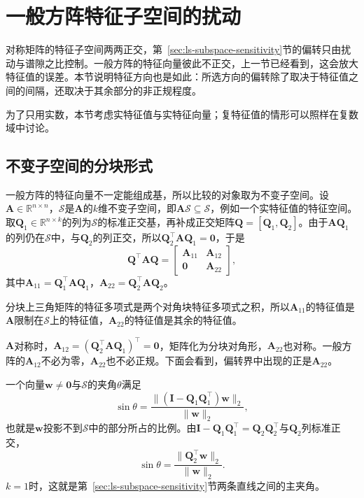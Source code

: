 
\section{一般方阵特征子空间的扰动}
\label{sec:ls-nonnormal-subspace-sensitivity}

对称矩阵的特征子空间两两正交，第~\ref{sec:ls-subspace-sensitivity}节的偏转只由扰动与谱隙之比控制。一般方阵的特征向量彼此不正交，上一节已经看到，这会放大特征值的误差。本节说明特征方向也是如此：所选方向的偏转除了取决于特征值之间的间隔，还取决于其余部分的非正规程度。

为了只用实数，本节考虑实特征值与实特征向量；复特征值的情形可以照样在复数域中讨论。

\subsection{不变子空间的分块形式}
一般方阵的特征向量不一定能组成基，所以比较的对象取为不变子空间。设$\bm A\in\mathbb R^{n\times n}$，$\mathcal S$是$\bm A$的$k$维不变子空间，即$\bm A\mathcal S\subseteq\mathcal S$，例如一个实特征值的特征空间。取$\bm Q_1\in\mathbb R^{n\times k}$的列为$\mathcal S$的标准正交基，再补成正交矩阵$\bm Q=[\bm Q_1,\bm Q_2]$。由于$\bm A\bm Q_1$的列仍在$\mathcal S$中，与$\bm Q_2$的列正交，所以$\bm Q_2^\top\bm A\bm Q_1=\bm0$，于是
\[
 \bm Q^\top\bm A\bm Q=\begin{bmatrix}\bm A_{11}&\bm A_{12}\\\bm0&\bm A_{22}\end{bmatrix},
\]
其中$\bm A_{11}=\bm Q_1^\top\bm A\bm Q_1$，$\bm A_{22}=\bm Q_2^\top\bm A\bm Q_2$。

分块上三角矩阵的特征多项式是两个对角块特征多项式之积，所以$\bm A_{11}$的特征值是$\bm A$限制在$\mathcal S$上的特征值，$\bm A_{22}$的特征值是其余的特征值。

$\bm A$对称时，$\bm A_{12}=(\bm Q_2^\top\bm A\bm Q_1)^\top=\bm0$，矩阵化为分块对角形，$\bm A_{22}$也对称。一般方阵的$\bm A_{12}$不必为零，$\bm A_{22}$也不必正规。下面会看到，偏转界中出现的正是$\bm A_{22}$。

一个向量$\bm w\neq\bm0$与$\mathcal S$的夹角$\theta$满足
\[
 \sin\theta=\frac{\lVert(\bm I-\bm Q_1\bm Q_1^\top)\bm w\rVert_2}{\lVert\bm w\rVert_2},
\]
也就是$\bm w$投影不到$\mathcal S$中的部分所占的比例。由$\bm I-\bm Q_1\bm Q_1^\top=\bm Q_2\bm Q_2^\top$与$\bm Q_2$列标准正交，
\[
 \sin\theta=\frac{\lVert\bm Q_2^\top\bm w\rVert_2}{\lVert\bm w\rVert_2}.
\]
$k=1$时，这就是第~\ref{sec:ls-subspace-sensitivity}节两条直线之间的主夹角。

